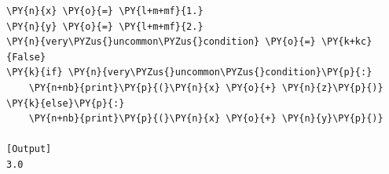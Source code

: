 \begin{Verbatim}[label=\makebox{\url{https://github.com/lucabaldini/cmepda/tree/master/slides/latex/snippets/linting1.py}},commandchars=\\\{\}]
\PY{n}{x} \PY{o}{=} \PY{l+m+mf}{1.}
\PY{n}{y} \PY{o}{=} \PY{l+m+mf}{2.}
\PY{n}{very\PYZus{}uncommon\PYZus{}condition} \PY{o}{=} \PY{k+kc}{False}
\PY{k}{if} \PY{n}{very\PYZus{}uncommon\PYZus{}condition}\PY{p}{:}
    \PY{n+nb}{print}\PY{p}{(}\PY{n}{x} \PY{o}{+} \PY{n}{z}\PY{p}{)}
\PY{k}{else}\PY{p}{:}
    \PY{n+nb}{print}\PY{p}{(}\PY{n}{x} \PY{o}{+} \PY{n}{y}\PY{p}{)}

[Output]
3.0
\end{Verbatim}